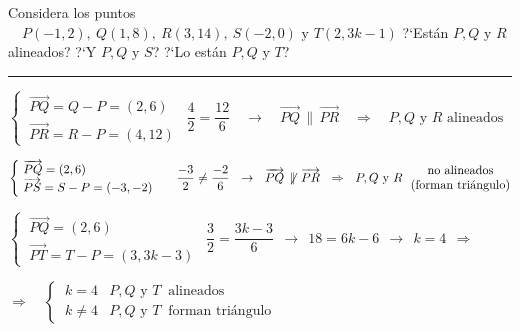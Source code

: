 \vspace{5mm}
\begin{miejercicio}

Considera los puntos $\quad P(-1,2),\ Q(1,8),\ R(3,14),\ S(-2,0) \text{ y } T(2,3k-1)$ ?`Están $P,Q \text{ y } R$ alineados? ?`Y $P,Q \text{ y } S$? ?`Lo están $P,Q \text{ y } T$?

\rule{250pt}{0.5pt}

\vspace{4mm} $\begin{cases} \ \overrightarrow{PQ}=Q-P=(2,6) \\ \ \overrightarrow{PR}=R-P=(4,12) \end{cases} \ \ \dfrac 4 2 = \dfrac{12}6 \quad \to \quad \overrightarrow{PQ}\, \parallel \, \overrightarrow{PR} \quad \Rightarrow \quad P, Q \text{ y } R \text{ alineados}$

\vspace{4mm} $\begin{cases} \ \overrightarrow{PQ}=(2,6) \\ \ \overrightarrow{PS}=S-P=(-3,-2) \end{cases} \ \ \dfrac {-3}2 \neq  \dfrac{-2}6 \ \  \to \ \ \overrightarrow{PQ}\, \not \parallel \, \overrightarrow{PR} \ \ \Rightarrow \ \ P, Q \text{ y } R \ \ \mqty{\text{no alineados} \\ \text{(forman triángulo)}}$

\vspace{4mm} $\begin{cases} \ \overrightarrow{PQ}=(2,6) \\ \ \overrightarrow{PT}=T-P=(3,3k-3) \end{cases} \ \ \dfrac {3}2 =  \dfrac{3k-3}6 \ \  \to \ \ 18=6k-6 \ \ \to \ \ k=4 \ \ \Rightarrow$

\vspace{2mm} $\Rightarrow \quad  \begin{cases} \ k=4 & P, Q \text{ y } T \ \text{ alineados} \\ \  k\neq 4 & P, Q \text{ y } T \ \text{ forman triángulo} \end{cases}$

	
\end{miejercicio}


